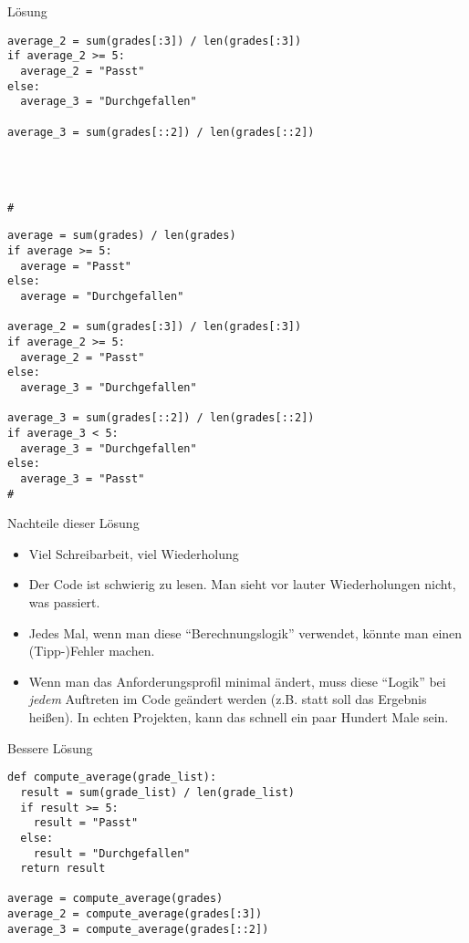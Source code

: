 \begin{fragile}{}
\begin{block}{Lösung }
\begin{overprint}
\begin{verbatim}
average_2 = sum(grades[:3]) / len(grades[:3])
if average_2 >= 5:
  average_2 = "Passt"
else: 
  average_3 = "Durchgefallen"

average_3 = sum(grades[::2]) / len(grades[::2])




#
\end{verbatim}
\begin{verbatim}
average = sum(grades) / len(grades)
if average >= 5: 
  average = "Passt"
else: 
  average = "Durchgefallen"

average_2 = sum(grades[:3]) / len(grades[:3])
if average_2 >= 5:
  average_2 = "Passt"
else: 
  average_3 = "Durchgefallen"

average_3 = sum(grades[::2]) / len(grades[::2])
if average_3 < 5:
  average_3 = "Durchgefallen"
else: 
  average_3 = "Passt"
#
\end{verbatim}
\end{overprint}
\end{block}
\end{fragile}

\begin{frame}
\begin{block}{Nachteile dieser Lösung}
	\pause 
	\begin{itemize}[<+->]
	\item Viel Schreibarbeit, viel Wiederholung
	\item Der Code ist schwierig zu lesen. Man sieht vor lauter Wiederholungen nicht, was passiert. 
	\item Jedes Mal, wenn man diese \enquote{Berechnungslogik} verwendet, könnte man einen (Tipp-)Fehler machen.  
	\item Wenn man das Anforderungsprofil minimal ändert, muss diese \enquote{Logik} bei \emph{jedem} Auftreten im Code geändert werden
		(z.B. statt  soll das Ergebnis  heißen). In echten Projekten, kann das schnell ein paar Hundert Male sein. 	
	\end{itemize}
\end{block}
\end{frame}

\begin{fragile}
\begin{block}{Bessere Lösung}
\begin{verbatim}
def compute_average(grade_list):
  result = sum(grade_list) / len(grade_list)
  if result >= 5:
    result = "Passt"
  else: 
    result = "Durchgefallen"
  return result

average = compute_average(grades)
average_2 = compute_average(grades[:3])
average_3 = compute_average(grades[::2])
\end{verbatim}
\end{block}

\end{fragile}

